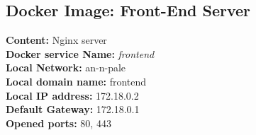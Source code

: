 \begin{appendices}
			\subsection{Docker Image: Front-End Server}
				\textbf{Content:} Nginx server \\
				\indent\textbf{Docker service Name:} {\itshape frontend} \\
				\indent\textbf{Local Network:} an-n-pale \\
				\indent\textbf{Local domain name:} frontend \\
				\indent\textbf{Local IP address:} 172.18.0.2 \\
				\indent\textbf{Default Gateway:} 172.18.0.1 \\
				\indent\textbf{Opened ports:} 80, 443 \\

			
\end{appendices}